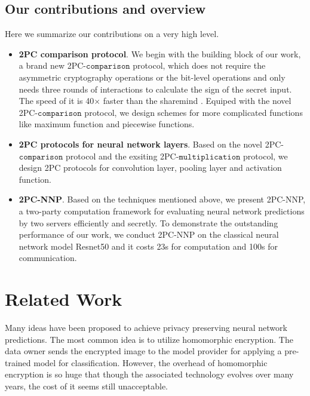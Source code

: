\documentclass[letterpaper]{article} %
\begin{document}
    \subsection{Our contributions and overview}%
    Here we summarize our contributions on a very high level.


    \begin{itemize}
        \item \textbf{2PC comparison protocol}. 
        We begin with the building block of our work, a brand new 2PC-$\mathtt{comparison}$ protocol,
        which does not require the asymmetric cryptography operations or the bit-level operations 
        and only needs three rounds of interactions to calculate the sign of the secret input.
        The speed of it is 40$\times$ faster than the sharemind \cite{Sharemind}.
        Equiped with the novel 2PC-$\mathtt{comparison}$ protocol, we design schemes for more complicated functions 
        like maximum function and piecewise functions.

        \item \textbf{2PC protocols for neural network layers}.
        Based on the novel 2PC-$\mathtt{comparison}$ protocol and the exsiting 2PC-$\mathtt{multiplication}$ protocol,
        we design 2PC protocols for convolution layer, pooling layer and activation function.

        \item \textbf{2PC-NNP}.        
        Based on the techniques mentioned above, 
        we present 2PC-NNP, a two-party computation framework 
        for evaluating neural network predictions by two servers efficiently and secretly. 
        To demonstrate the outstanding performance of our work, 
        we conduct 2PC-NNP on the classical neural network model Resnet50 and
        it costs 23s for computation and 100s for communication. 

    \end{itemize}






\section{Related Work}    


    Many ideas have been proposed to achieve privacy preserving neural network predictions. 
    The most common idea is to utilize homomorphic encryption.
    The data owner sends the encrypted image to the model provider for applying a pre-trained model for classification.
    However, the overhead of homomorphic encryption is so huge that though 
    the associated technology evolves over many years\cite{ObliviousNeuralNetwork}, the cost of it seems still unacceptable.
    
\end{document}
